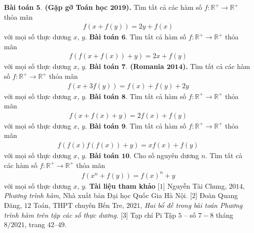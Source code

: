 \begin{multicols}{2}
	\vskip 0.1cm
	\textbf{\color{hoccungpi}Bài toán $\pmb{5.}$ (Gặp gỡ Toán học $\pmb{2019}$).}
	Tìm tất cả các hàm số $f: \mathbb{R}^{+} \rightarrow \mathbb{R}^{+}$ thỏa mãn
	\begin{align*}
		f(x+f(y))=2 y+f(x)
	\end{align*}
	với mọi số thực dương $x$, $y$.
	\vskip 0.1cm
	\textbf{\color{hoccungpi}Bài toán $\pmb{6.}$}
	Tìm tất cả hàm số $f: \mathbb{R}^{+} \rightarrow \mathbb{R}^{+}$ thỏa mãn
	\begin{align*}
			f(f(x+f(x))+y)=2 x+f(y)
	\end{align*}
	với mọi số thực dương $x$, $y$.
	\vskip 0.1cm
	\textbf{\color{hoccungpi}Bài toán $\pmb{7.}$ (Romania $\pmb{2014}$).}
	Tìm tất cả các hàm số $f: \mathbb{R}^{+} \rightarrow \mathbb{R}^{+}$ thỏa mãn
	\begin{align*}
		f(x+3 f(y))=f(x)+f(y)+2 y 
	\end{align*}
	với mọi số thực dương $x$, $y$.
	\vskip 0.1cm
	\textbf{\color{hoccungpi}Bài toán $\pmb{8.}$}	Tìm tất cả hàm số $f: \mathbb{R}^{+} \rightarrow \mathbb{R}^{+}$ thỏa mãn
	\begin{align*}
		f(x+f(x)+y)=2 f(x)+f(y) 
	\end{align*}	
	với mọi số thực dương $x$, $y$.
	\vskip 0.1cm
	\textbf{\color{hoccungpi}Bài toán $\pmb{9.}$}
	Tìm tất cả hàm số $f: \mathbb{R}^{+} \rightarrow \mathbb{R}^{+}$ thỏa mãn
	\begin{align*}
		f(f(x) f(f(x))+y)=x f(x)+f(y)
	\end{align*}
		với mọi số thực dương $x$, $y$.
	\vskip 0.1cm
	\textbf{\color{hoccungpi}Bài toán $\pmb{10.}$}
	Cho số nguyên dương $n$.
	Tìm tất cả các hàm số $f:\mathbb{R}^{+}  \to \mathbb{R}^{+} $ thỏa mãn 
	\begin{align*}
		f\left( {{x^n} + f(y)} \right) = f(x)^n + y
	\end{align*}
	với mọi số thực dương $x$, $y$.
	\vskip 0.1cm	
	\textbf{\color{hoccungpi}Tài liệu tham khảo}
	\vskip 0.1cm
	[$1$] Nguyễn Tài Chung, $2014$, {\it Phương trình hàm}, {Nhà xuất bản Đại học Quốc Gia Hà Nội.}
	\vskip 0.1cm
	[$2$] Đoàn Quang Đăng, $12$ Toán, THPT chuyên Bến Tre, $2021$,
	{\it Hai bổ đề trong bài toán Phương trình hàm trên tập các số thực dương.}
	\vskip 0.1cm
	[$3$] Tạp chí Pi Tập $5$ -- số $7-8$ tháng $8/2021$,  trang $42$--$49$.
\end{multicols}